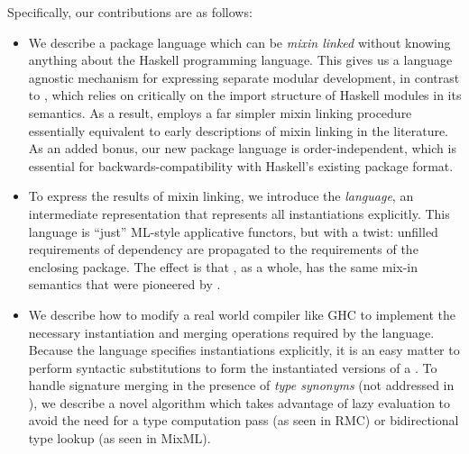 Specifically, our contributions are as follows:
\begin{itemize}

    \item We describe a package language which can be \emph{mixin
    linked} without knowing anything about the Haskell programming
    language.  This gives us a language agnostic mechanism for
    expressing separate modular development, in contrast to
    \OldBackpack{}, which relies on critically on the import structure
    of Haskell modules in its semantics.  As a result, \Backpack{}
    employs a far simpler mixin linking procedure essentially equivalent
    to early descriptions of mixin linking in the literature.  As an
    added bonus, our new package language is order-independent, which is
    essential for backwards-compatibility with Haskell's existing
    package format.

    \item To express the results of mixin linking, we introduce the
    \emph{\unit{} language}, an intermediate representation that
    represents all instantiations explicitly.  This language is
    ``just'' ML-style applicative functors, but with a twist:
    unfilled requirements of dependency are propagated to the requirements
    of the enclosing package.  The effect is that \Backpack{}, as a
    whole, has the same mix-in semantics that were pioneered by \OldBackpack{}.

    \item We describe how to modify a real world compiler like GHC to
    implement the necessary instantiation and merging operations
    required by the \unit{} language.  Because the \unit{} language
    specifies instantiations explicitly, it is an easy matter to perform
    syntactic substitutions to form the instantiated versions of a
    \unit{}.  To handle signature merging in the presence of \emph{type
    synonyms} (not addressed in \OldBackpack{}), we describe a novel
    algorithm which takes advantage of lazy evaluation to avoid the need
    for a type computation pass (as seen in RMC) or bidirectional type
    lookup (as seen in MixML).



\end{itemize}
